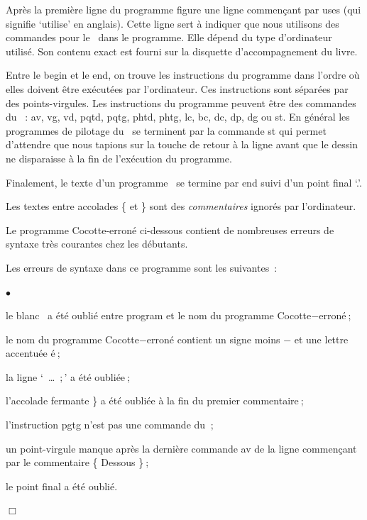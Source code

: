 Après la première ligne du programme figure une ligne commençant par
{\mcl uses} (qui signifie `utilise' en anglais). Cette ligne sert à indiquer
que nous utilisons des commandes pour le \robot\ dans le programme. Elle dépend
du type d'or\-di\-na\-teur utilisé. Son contenu exact est fourni sur la disquette
d'ac\-com\-pa\-gne\-ment du livre. 

Entre le {\mcl begin} et le {\mcl end}, on trouve les instructions 
du programme dans l'ordre où elles doivent être exécutées par
l'or\-di\-na\-teur. Ces instructions sont
séparées par des points-virgules. Les instructions du programme
peuvent être des commandes du \hbox{\robot\ :} {\idt av}, {\idt vg}, {\idt vd}, {\idt pqtd}, 
{\idt pqtg}, {\idt phtd}, {\idt phtg}, {\idt lc}, {\idt bc}, {\idt dc}, {\idt dp}, 
{\idt dg} ou {\idt st}. En général les programmes de pilotage du \robot\ se
terminent par la commande {\idt st} qui permet d'attendre que nous
tapions sur la touche de retour à la ligne avant que le dessin ne 
disparaisse à la fin de l'exécution du programme.

Finalement, le texte d'un programme \pascal\ se termine par {\mcl end}
suivi d'un point final `.'. 

Les textes entre accolades {\idt \{} et {\idt \}} sont des {\em commentaires}
ignorés par l'ordinateur.

Le pro\-gram\-me
{\idt Cocotte-erroné} ci-dessous contient
de nombreuses erreurs de syntaxe très courantes chez les débutants.

\begin{exemple}{\hfill

\label{prog:Cocotte-errone} 
\noindent Les erreurs de syntaxe dans ce programme sont les \hbox{suivantes :}
\begin{list}{$\scriptscriptstyle\bullet$}{
\renewcommand{\labelwidth}{3mm}
\renewcommand{\labelsep}{3mm}
\renewcommand{\leftmargin}{10mm}
\renewcommand{\rightmargin}{0mm}
}
\item[1.] le blanc \blanc\ a été oublié entre {\mcl program} et le nom
du programme {\idt Co\-cot\-te$-$er\-ro\-né}$\:$;
\item[2.] le nom du programme {\idt Cocotte$-$erroné} contient un signe moins 
{\idt $-$} et une lettre accentuée {\idt é}$\:$;
\item[3.] la ligne `{\ \ldots\ $;$}' a été oubliée$\:$;
\item[4.] l'accolade fermante {\idt \}} a été oubliée à la fin du premier
commentaire$\:$;
\item[5.] l'instruction {\idt pgtg} n'est pas une commande du \robotErr$\:$;
\item[6.] un point-virgule manque après la dernière commande {\idt av}  de la  ligne
commençant par le commentaire {\cmt \{ Dessous \}}$\:$;
\item[7.] le point final a été oublié.
\end{list}
\noindent $\Box$ }\end{exemple}


